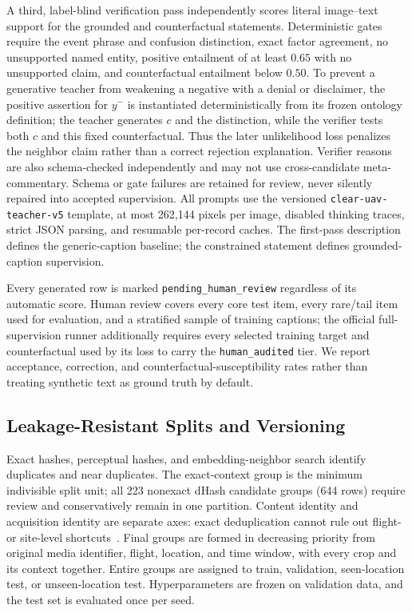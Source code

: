 A third, label-blind verification pass independently scores literal image--text support for the grounded and counterfactual statements. Deterministic gates require the event phrase and confusion distinction, exact factor agreement, no unsupported named entity, positive entailment of at least $0.65$ with no unsupported claim, and counterfactual entailment below $0.50$. To prevent a generative teacher from weakening a negative with a denial or disclaimer, the positive assertion for $y^{-}$ is instantiated deterministically from its frozen ontology definition; the teacher generates $c$ and the distinction, while the verifier tests both $c$ and this fixed counterfactual. Thus the later unlikelihood loss penalizes the neighbor claim rather than a correct rejection explanation. Verifier reasons are also schema-checked independently and may not use cross-candidate meta-commentary. Schema or gate failures are retained for review, never silently repaired into accepted supervision. All prompts use the versioned \texttt{clear-uav-teacher-v5} template, at most 262,144 pixels per image, disabled thinking traces, strict JSON parsing, and resumable per-record caches. The first-pass description defines the generic-caption baseline; the constrained statement defines grounded-caption supervision.

Every generated row is marked \texttt{pending\_human\_review} regardless of its automatic score. Human review covers every core test item, every rare/tail item used for evaluation, and a stratified sample of training captions; the official full-supervision runner additionally requires every selected training target and counterfactual used by its loss to carry the \texttt{human\_audited} tier. We report acceptance, correction, and counterfactual-susceptibility rates rather than treating synthetic text as ground truth by default.

\subsection{Leakage-Resistant Splits and Versioning}

Exact hashes, perceptual hashes, and embedding-neighbor search identify duplicates and near duplicates. The exact-context group is the minimum indivisible split unit; all 223 nonexact dHash candidate groups (644 rows) require review and conservatively remain in one partition. Content identity and acquisition identity are separate axes: exact deduplication cannot rule out flight- or site-level shortcuts~\cite{zhang2026leakageaudit}. Final groups are formed in decreasing priority from original media identifier, flight, location, and time window, with every crop and its context together. Entire groups are assigned to train, validation, seen-location test, or unseen-location test. Hyperparameters are frozen on validation data, and the test set is evaluated once per seed.

